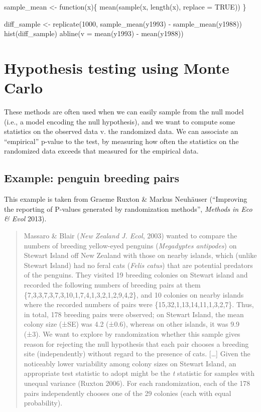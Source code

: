 \documentclass[
  letterpaper,
  DIV=11,
  numbers=noendperiod]{scrreprt}
\newenvironment{Shaded}{\begin{snugshade}}{\end{snugshade}}
\newcommand{\NormalTok}[1]{\textcolor[rgb]{0.00,0.23,0.31}{#1}}
\begin{document}
\begin{Shaded}
\begin{Highlighting}[]
\NormalTok{sample\_mean \textless{}{-} function(x)\{}
\NormalTok{  mean(sample(x, length(x), replace = TRUE))}
\NormalTok{\}}

\NormalTok{diff\_sample \textless{}{-} replicate(1000, sample\_mean(y1993) {-} sample\_mean(y1988))}
\NormalTok{hist(diff\_sample)}
\NormalTok{abline(v = mean(y1993) {-} mean(y1988))}
\end{Highlighting}
\end{Shaded}

\section{Hypothesis testing using Monte
Carlo}\label{hypothesis-testing-using-monte-carlo}

These methods are often used when we can easily sample from the null
model (i.e., a model encoding the null hypothesis), and we want to
compute some statistics on the observed data v. the randomized data. We
can associate an ``empirical'' p-value to the test, by measuring how
often the statistics on the randomized data exceeds that measured for
the empirical data.

\subsection{Example: penguin breeding
pairs}\label{example-penguin-breeding-pairs}

This example is taken from Graeme Ruxton \& Markus Neuhäuser
(``Improving the reporting of P-values generated by randomization
methods'', \emph{Methods in Eco \& Evol} 2013).

\begin{quote}
Massaro \& Blair (\emph{New Zealand J. Ecol}, 2003) wanted to compare
the numbers of breeding yellow-eyed penguins (\emph{Megadyptes
antipodes}) on Stewart Island off New Zealand with those on nearby
islands, which (unlike Stewart Island) had no feral cats (\emph{Felis
catus}) that are potential predators of the penguins. They visited 19
breeding colonies on Stewart island and recorded the following numbers
of breeding pairs at them \{7,3,3,7,3,7,3,10,1,7,4,1,3,2,1,2,9,4,2\},
and 10 colonies on nearby islands where the recorded numbers of pairs
were \{15,32,1,13,14,11,1,3,2,7\}. Thus, in total, 178 breeding pairs
were observed; on Stewart Island, the mean colony size (±SE) was 4.2
(±0.6), whereas on other islands, it was 9.9 (±3). We want to explore by
randomization whether this sample gives reason for rejecting the null
hypothesis that each pair chooses a breeding site (independently)
without regard to the presence of cats. {[}\ldots{]} Given the
noticeably lower variability among colony sizes on Stewart Island, an
appropriate test statistic to adopt might be the \emph{t} statistic for
samples with unequal variance (Ruxton 2006). For each randomization,
each of the 178 pairs independently chooses one of the 29 colonies (each
with equal probability).
\end{quote}
\end{document}
